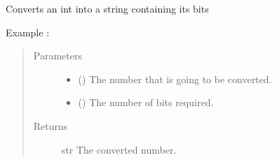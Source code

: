 \documentclass[letterpaper,10pt,english]{sphinxmanual}
\begin{document}
\begin{fulllineitems}
\label{\detokenize{basis_change:mermin_on_qiskit.basis_change.convert_in_binary}}
Converts an int into a string containing its bits
\begin{description}
\item[{Example :}] \leavevmode
\begin{sphinxVerbatim}[commandchars=\\\{\}]
\end{sphinxVerbatim}

\end{description}
\begin{quote}\begin{description}
\item[{Parameters}] \leavevmode\begin{itemize}
\item {} 
 () \textendash{} The number that is going to be converted.

\item {} 
 () \textendash{} The number of bits required.

\end{itemize}

\item[{Returns}] \leavevmode
str \textendash{} The converted number.

\end{description}\end{quote}

\end{fulllineitems}

\end{document}
